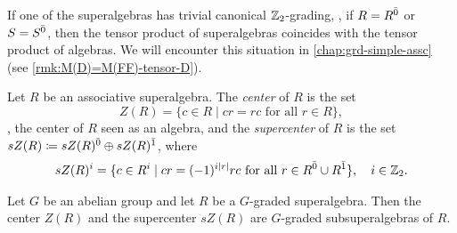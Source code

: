 If one of the superalgebras has trivial canonical $\mathbb{Z}_2$-grading, \ie, if $R = R^{\bar0}$ or $S = S^{\bar0}$, then the tensor product of superalgebras coincides with the tensor product of algebras. 
We will encounter this situation in \cref{chap:grd-simple-assc} (see \cref{rmk:M(D)=M(FF)-tensor-D}). 



\begin{defi}\label{defi:center}
	Let $R$ be an associative superalgebra.
	The \emph{center} of $R$ is the set
	\[
		Z(R) = \{c\in R \mid cr = rc \text{ for all } r\in R \},
	\]
	\ie, the center of $R$ seen as an algebra, and the \emph{supercenter} of $R$ is the set $sZ(R) \coloneqq sZ(R)^{\bar0} \oplus sZ(R)^{\bar1}$, where
	\begin{align*}
		sZ(R)^i = \{c\in R^i \mid cr = (-1)^{i |r|} rc \text{ for all } r\in R^{\bar0}\cup R^{\bar1} \},\quad i \in \mathbb{Z}_2.
	\end{align*}
\end{defi}





\begin{lemma}\label{lemma:center-is-graded}
	Let $G$ be an abelian group and let $R$ be a $G$-graded superalgebra.
	Then the center $Z(R)$ and the supercenter $sZ(R)$ are $G$-graded subsuperalgebras of $R$.
\end{lemma}

